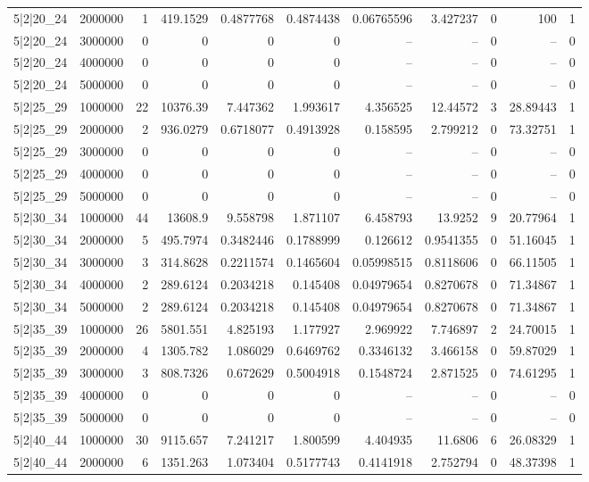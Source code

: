 \begin{tabular}{lrrrrrrrrrr}
5|2|20\_24 & 2000000 & 1 & 419.1529 & 0.4877768 & 0.4874438 & 0.06765596 & 3.427237 & 0 & 100 & 1 \\
5|2|20\_24 & 3000000 & 0 & 0 & 0 & 0 & -- & -- & 0 & -- & 0 \\
5|2|20\_24 & 4000000 & 0 & 0 & 0 & 0 & -- & -- & 0 & -- & 0 \\
5|2|20\_24 & 5000000 & 0 & 0 & 0 & 0 & -- & -- & 0 & -- & 0 \\
5|2|25\_29 & 1000000 & 22 & 10376.39 & 7.447362 & 1.993617 & 4.356525 & 12.44572 & 3 & 28.89443 & 1 \\
5|2|25\_29 & 2000000 & 2 & 936.0279 & 0.6718077 & 0.4913928 & 0.158595 & 2.799212 & 0 & 73.32751 & 1 \\
5|2|25\_29 & 3000000 & 0 & 0 & 0 & 0 & -- & -- & 0 & -- & 0 \\
5|2|25\_29 & 4000000 & 0 & 0 & 0 & 0 & -- & -- & 0 & -- & 0 \\
5|2|25\_29 & 5000000 & 0 & 0 & 0 & 0 & -- & -- & 0 & -- & 0 \\
5|2|30\_34 & 1000000 & 44 & 13608.9 & 9.558798 & 1.871107 & 6.458793 & 13.9252 & 9 & 20.77964 & 1 \\
5|2|30\_34 & 2000000 & 5 & 495.7974 & 0.3482446 & 0.1788999 & 0.126612 & 0.9541355 & 0 & 51.16045 & 1 \\
5|2|30\_34 & 3000000 & 3 & 314.8628 & 0.2211574 & 0.1465604 & 0.05998515 & 0.8118606 & 0 & 66.11505 & 1 \\
5|2|30\_34 & 4000000 & 2 & 289.6124 & 0.2034218 & 0.145408 & 0.04979654 & 0.8270678 & 0 & 71.34867 & 1 \\
5|2|30\_34 & 5000000 & 2 & 289.6124 & 0.2034218 & 0.145408 & 0.04979654 & 0.8270678 & 0 & 71.34867 & 1 \\
5|2|35\_39 & 1000000 & 26 & 5801.551 & 4.825193 & 1.177927 & 2.969922 & 7.746897 & 2 & 24.70015 & 1 \\
5|2|35\_39 & 2000000 & 4 & 1305.782 & 1.086029 & 0.6469762 & 0.3346132 & 3.466158 & 0 & 59.87029 & 1 \\
5|2|35\_39 & 3000000 & 3 & 808.7326 & 0.672629 & 0.5004918 & 0.1548724 & 2.871525 & 0 & 74.61295 & 1 \\
5|2|35\_39 & 4000000 & 0 & 0 & 0 & 0 & -- & -- & 0 & -- & 0 \\
5|2|35\_39 & 5000000 & 0 & 0 & 0 & 0 & -- & -- & 0 & -- & 0 \\
5|2|40\_44 & 1000000 & 30 & 9115.657 & 7.241217 & 1.800599 & 4.404935 & 11.6806 & 6 & 26.08329 & 1 \\
5|2|40\_44 & 2000000 & 6 & 1351.263 & 1.073404 & 0.5177743 & 0.4141918 & 2.752794 & 0 & 48.37398 & 1 \\

\end{tabular}
